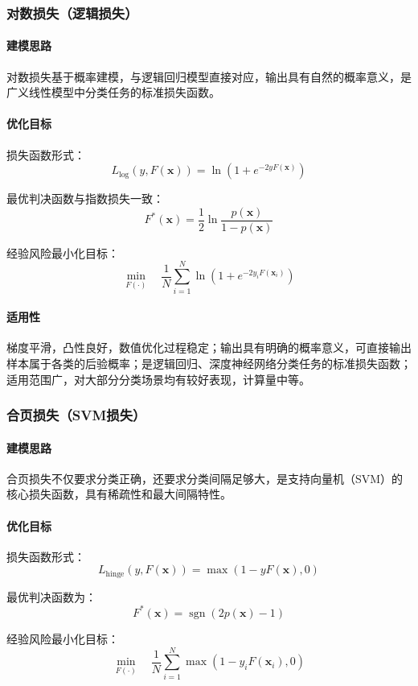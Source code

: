 \documentclass[12pt,a4paper]{article}
\DeclareMathOperator{\sgn}{sgn}
\newcommand{\x}{\boldsymbol{x}}
\begin{document}
\subsubsection{对数损失（逻辑损失）}
\paragraph{建模思路}
对数损失基于概率建模，与逻辑回归模型直接对应，输出具有自然的概率意义，是广义线性模型中分类任务的标准损失函数。

\paragraph{优化目标}
损失函数形式：
$$
L_{\text{log}}(y, F(\x)) = \ln\left(1 + e^{-2yF(\x)}\right)
$$

最优判决函数与指数损失一致：
$$
F^*(\x) = \frac{1}{2} \ln \frac{p(\x)}{1-p(\x)}
$$

经验风险最小化目标：
$$
\min_{F(\cdot)} \quad \frac{1}{N} \sum_{i=1}^N \ln\left(1 + e^{-2y_i F(\x_i)}\right)
$$

\paragraph{适用性}
梯度平滑，凸性良好，数值优化过程稳定；输出具有明确的概率意义，可直接输出样本属于各类的后验概率；是逻辑回归、深度神经网络分类任务的标准损失函数；适用范围广，对大部分分类场景均有较好表现，计算量中等。

\subsubsection{合页损失（SVM损失）}
\paragraph{建模思路}
合页损失不仅要求分类正确，还要求分类间隔足够大，是支持向量机（SVM）的核心损失函数，具有稀疏性和最大间隔特性。

\paragraph{优化目标}
损失函数形式：
$$
L_{\text{hinge}}(y, F(\x)) = \max\left(1 - yF(\x), 0\right)
$$

最优判决函数为：
$$
F^*(\x) = \sgn\left(2p(\x) - 1\right)
$$

经验风险最小化目标：
$$
\min_{F(\cdot)} \quad \frac{1}{N} \sum_{i=1}^N \max\left(1 - y_i F(\x_i), 0\right)
$$
\end{document}
